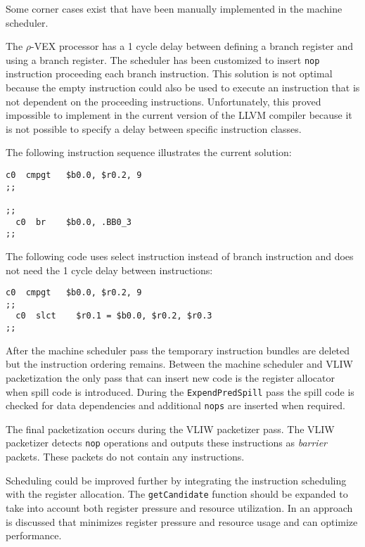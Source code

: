 Some corner cases exist that have been manually implemented in the machine scheduler.

The $\rho$-VEX processor has a 1 cycle delay between defining a branch register and using a branch register. The scheduler has been customized to insert \texttt{nop} instruction proceeding each branch instruction. This solution is not optimal because the empty instruction could also be used to execute an instruction that is not dependent on the proceeding instructions. Unfortunately, this proved impossible to implement in the current version of the LLVM compiler because it is not possible to specify a delay between specific instruction classes.

The following instruction sequence illustrates the current solution: 
\pagebreak

\begin{lstlisting}[language=rvex]
  c0  cmpgt   $b0.0, $r0.2, 9
;;

;;
  c0  br    $b0.0, .BB0_3
;;
\end{lstlisting}

The following code uses select instruction instead of branch instruction and does not need the 1 cycle delay between instructions:

\begin{lstlisting}[language=rvex]
  c0  cmpgt   $b0.0, $r0.2, 9
;;
  c0  slct    $r0.1 = $b0.0, $r0.2, $r0.3 
;;
\end{lstlisting}

After the machine scheduler pass the temporary instruction bundles are deleted but the instruction ordering remains. Between the machine scheduler and VLIW packetization the only pass that can insert new code is the register allocator when spill code is introduced. During the \texttt{ExpendPredSpill} pass the spill code is checked for data dependencies and additional \texttt{nops} are inserted when required.

The final packetization occurs during the VLIW packetizer pass. The VLIW packetizer detects \texttt{nop} operations and outputs these instructions as \emph{barrier} packets. These packets do not contain any instructions.

Scheduling could be improved further by integrating the instruction scheduling with the register allocation. The \texttt{getCandidate} function should be expanded to take into account both register pressure and resource utilization. In \cite{Bradlee:1991:IRA:106973.106986} an approach is discussed that minimizes register pressure and resource usage and can optimize performance.

